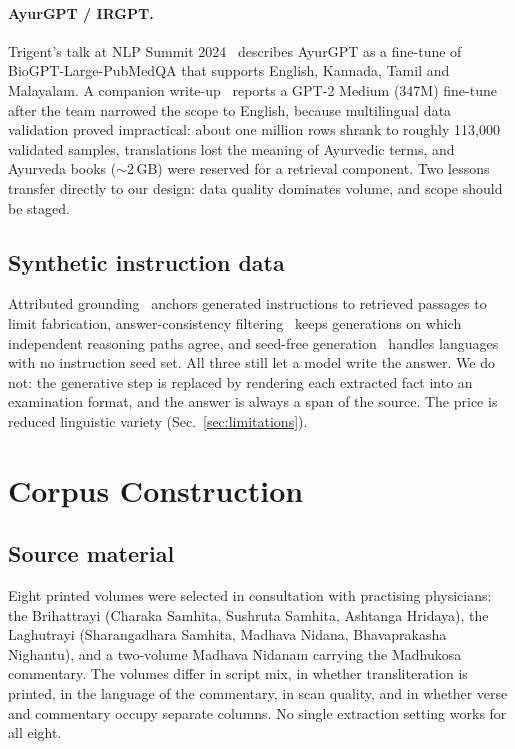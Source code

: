 \documentclass[10pt,twocolumn,letterpaper]{article}
\begin{document}
\paragraph{AyurGPT / IRGPT.}
Trigent's talk at NLP Summit 2024~\cite{ayurnlp} describes AyurGPT as a fine-tune
of BioGPT-Large-PubMedQA that supports English, Kannada, Tamil and Malayalam. A
companion write-up~\cite{ayurgpt} reports a GPT-2 Medium (347M) fine-tune after
the team narrowed the scope to English, because multilingual data validation
proved impractical: about one million rows shrank to roughly 113{,}000 validated
samples, translations lost the meaning of Ayurvedic terms, and Ayurveda books
($\sim$2\,GB) were reserved for a retrieval component. Two lessons transfer
directly to our design: data quality dominates volume, and scope should be staged.

\subsection{Synthetic instruction data}

Attributed grounding~\cite{attrground} anchors generated instructions to retrieved
passages to limit fabrication, answer-consistency filtering~\cite{cotself} keeps
generations on which independent reasoning paths agree, and seed-free
generation~\cite{seedfree} handles languages with no instruction seed set. All three
still let a model write the answer. We do not: the generative step is replaced by
rendering each extracted fact into an examination format, and the answer is always
a span of the source. The price is reduced linguistic variety (Sec.~\ref{sec:limitations}).

\section{Corpus Construction}
\label{sec:corpus}

\subsection{Source material}

Eight printed volumes were selected in consultation with practising physicians:
the Brihattrayi (Charaka Samhita, Sushruta Samhita, Ashtanga Hridaya), the
Laghutrayi (Sharangadhara Samhita, Madhava Nidana, Bhavaprakasha Nighantu), and a
two-volume Madhava Nidanam carrying the Madhukosa commentary. The volumes differ in
script mix, in whether transliteration is printed, in the language of the
commentary, in scan quality, and in whether verse and commentary occupy separate
columns. No single extraction setting works for all eight.
\end{document}

